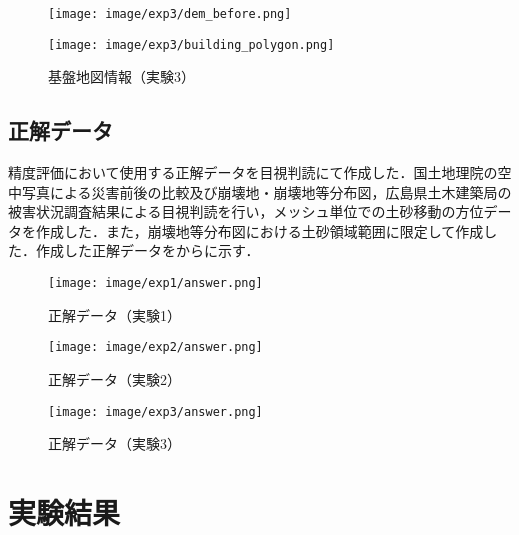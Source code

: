       \begin{figure}[tbp]
        \begin{minipage}[c]{0.5\hsize}
          \centering
          \texttt{[image: image/exp3/dem\_before.png]}
        \end{minipage}
        \begin{minipage}[c]{0.5\hsize}
          \centering
          \texttt{[image: image/exp3/building\_polygon.png]}
        \end{minipage}
        \caption{基盤地図情報（実験3）}
        \label{基盤地図情報（実験3）}
      \end{figure}


    \subsection*{正解データ}
      精度評価において使用する正解データを目視判読にて作成した．国土地理院の空中写真による災害前後の比較及び崩壊地・崩壊地等分布図，広島県土木建築局の被害状況調査結果\cite{国土地理院空撮画像1, 国土地理院空撮画像2, 被害状況}による目視判読を行い，メッシュ単位での土砂移動の方位データを作成した．また，崩壊地等分布図における土砂領域範囲に限定して作成した．作成した正解データをからに示す．

      \begin{figure}[tbp]
        \centering
        \texttt{[image: image/exp1/answer.png]}
        \caption{正解データ（実験1）}
        \label{正解データ（実験1）}
      \end{figure}

      \begin{figure}[tbp]
        \centering
        \texttt{[image: image/exp2/answer.png]}
        \caption{正解データ（実験2）}
      \end{figure}

      \begin{figure}[tbp]
        \centering
        \texttt{[image: image/exp3/answer.png]}
        \caption{正解データ（実験3）}
        \label{正解データ（実験3）}
      \end{figure}


  \section{実験結果}
    \label{実験結果}
